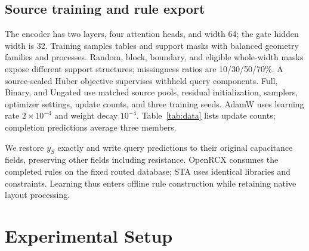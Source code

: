 \documentclass[conference,10pt,letterpaper]{IEEEtran}
\begin{document}
\subsection{Source training and rule export}
The encoder has two layers, four attention heads, and width 64; the gate hidden width is 32. Training samples tables and support masks with balanced geometry families and processes. Random, block, boundary, and eligible whole-width masks expose different support structures; missingness ratios are 10/30/50/70\%. A source-scaled Huber objective supervises withheld query components. Full, Binary, and Ungated use matched source pools, residual initialization, samplers, optimizer settings, update counts, and three training seeds. AdamW uses learning rate $2\!\times\!10^{-4}$ and weight decay $10^{-4}$. Table~\ref{tab:data} lists update counts; completion predictions average three members.

We restore $y_S$ exactly and write query predictions to their original capacitance fields, preserving other fields including resistance. OpenRCX consumes the completed rules on the fixed routed database; STA uses identical libraries and constraints. Learning thus enters offline rule construction while retaining native layout processing.

\section{Experimental Setup}
\end{document}
